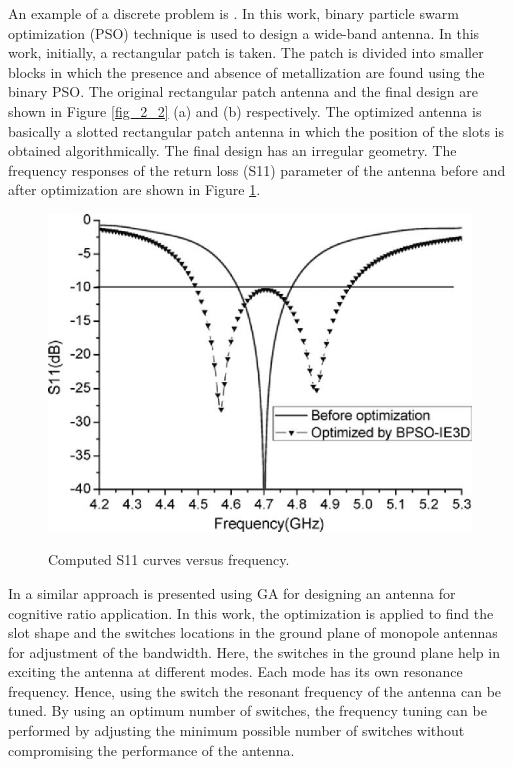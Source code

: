 An example of a discrete problem is \cite{optPatch}. In this work, binary particle swarm optimization (PSO) technique is used to design a wide-band antenna. In this work, initially, a rectangular patch is taken. The patch is divided into smaller blocks in which the presence and absence of metallization are found using the binary PSO. The original rectangular patch antenna and the final design are shown in Figure \ref{fig_2_2} (a) and (b) respectively. The optimized antenna is basically a slotted rectangular patch antenna in which the position of the slots is obtained algorithmically. The final design has an irregular geometry. The frequency responses of the return loss (S11) parameter of the antenna before and after optimization are shown in Figure \ref{fig_2_3}.

\begin{figure}
  \centering
  \includegraphics[width=0.3\linewidth]{fig_2_3.eps}\\
  \caption [Computed S11 curves versus frequency]{Computed S11 curves versus frequency. \cite{patch_miniaturize_ga}} \label{fig_2_3}
\end{figure}

In \cite{freqReconfCogn} a similar approach is presented using GA for designing an antenna for cognitive ratio application. In this work, the optimization is applied to find the slot shape and the switches locations in the ground plane of monopole antennas for adjustment of the bandwidth. Here, the switches in the ground plane help in exciting the antenna at different modes. Each mode has its own resonance frequency. Hence, using the switch the resonant frequency of the antenna can be tuned. By using an optimum number of switches, the frequency tuning can be performed by adjusting the minimum possible number of switches without compromising the performance of the antenna.

